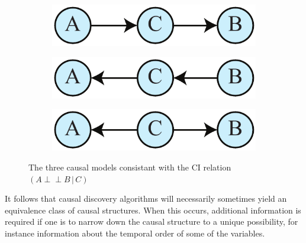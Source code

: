 \documentclass[12pt,onecolumn,nofootinbib]{revtex4-2}
\def\indep{\perp\!\!\!\!\perp}
\begin{document}
\begin{figure}[h]
        \begin{subfigure}[b]{0.2\textwidth}
                	\centering
                	\includegraphics[width=\textwidth]{markovchain1}
		\caption{}
                	\label{fig:markovchain1}
        \end{subfigure}
        \quad\quad
        \begin{subfigure}[b]{0.2\textwidth}
                	\centering
                	\includegraphics[width=\textwidth]{markovchain2}
		\caption{}
                	\label{fig:markovchain2}
        \end{subfigure}
        \quad
        \begin{subfigure}[b]{0.2\textwidth}
                	\centering
                	\includegraphics[width=\textwidth]{markovchain3}
		\caption{}
                	\label{fig:markovchain3}
        \end{subfigure}
 \caption{The three causal models consistant with the CI relation $(A\indep B\,|\,C)$}
        \label{fig:markovchain}
\end{figure}

It follows that causal discovery algorithms will necessarily sometimes yield an equivalence class of
causal structures.  When this occurs, additional information is required if one is to narrow down the causal structure to a unique possibility, for instance information about the temporal order of some of the variables.
\end{document}
